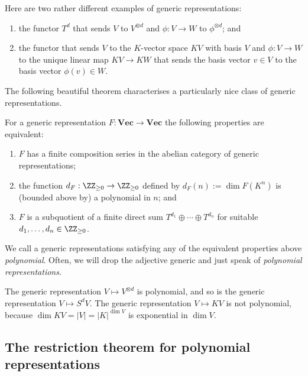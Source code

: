 \documentclass{amsart}
\renewcommand{\Vec}{\mathbf{Vec}}
\begin{document}
\begin{ex}
Here are two rather different examples of generic
representations: 
\begin{enumerate}
\item the functor $T^d$ that sends $V$ to $V^{\otimes d}$ and $\phi:V
\to W$ to $\phi^{\otimes d}$; and 
\item the functor that sends $V$ to the $K$-vector space $KV$
with basis $V$ and $\phi:V \to W$ to the unique linear map
$KV \to KW$ that sends the basis vector $v \in V$ to the
basis vector $\phi(v) \in W$. \qedhere
\end{enumerate}
\end{ex}

The following beautiful theorem characterises a particularly
nice class of generic representations. 

\begin{thm} \label{thm:Kuhn}
For a generic representation $F: \Vec \to \Vec$ the
following properties are equivalent: 
\begin{enumerate}
\item $F$ has a finite composition series in the abelian
category of generic representations;
\item the function $d_F:\ZZ_{\geq 0} \to \ZZ_{\geq 0}$
defined by $d_F(n):=\dim F(K^n)$ is (bounded above by) a
polynomial in $n$; and 
\item $F$ is a subquotient of a finite direct sum $T^{d_1}
\oplus \cdots \oplus T^{d_n}$ for suitable $d_1,\ldots,d_n
\in \ZZ_{\geq 0}$. 
\end{enumerate}
\end{thm}

We call a generic representations satisfying any of the equivalent
properties above {\em polynomial}. Often, we will drop the adjective
generic and just speak of {\em polynomial representations}.

\begin{ex}
The generic representation $V \mapsto V^{\otimes d}$ is
polynomial, and so is the generic representation $V \mapsto
S^d V$. The generic representation $V \mapsto KV$ is not
polynomial, because $\dim KV=|V|=|K|^{\dim V}$ is
exponential in $\dim V$.
\end{ex}

\subsection{The restriction theorem for polynomial representations }
\end{document}
